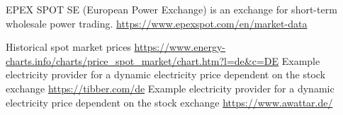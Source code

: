 \documentclass[conference, xcolor=dvipsnames]{IEEEtran}
\begin{document}
	
	\begin{thebibliography}{00}
			
		 EPEX SPOT SE (European Power Exchange) is an exchange for short-term wholesale power trading.  \url{https://www.epexspot.com/en/market-data}
		
		 Historical spot market prices  \url{https://www.energy-charts.info/charts/price_spot_market/chart.htm?l=de&c=DE}
		 Example electricity provider for a dynamic electricity price dependent on the stock exchange \url{https://tibber.com/de}
		 Example electricity provider for a dynamic electricity price dependent on the stock exchange \url{https://www.awattar.de/}
		
		
	
		
		
		
		
		
		
		
		
		
		

\end{thebibliography}
\end{document}

